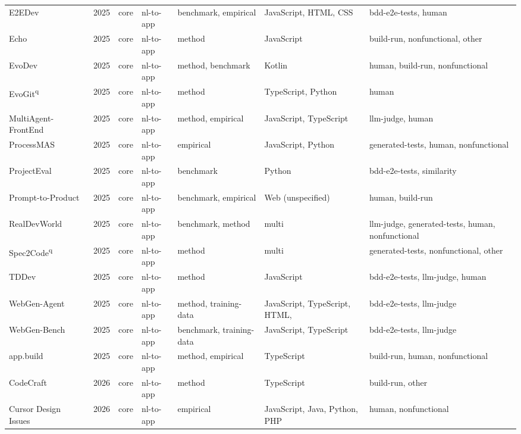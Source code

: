 {\begin{longtable}{@{}p{2.8cm}lllp{1.9cm}p{1.5cm}p{2.9cm}@{}}
E2EDev~\cite{E2EDev2025} & 2025 & core & nl-to-app & benchmark, empirical & JavaScript, HTML, CSS & bdd-e2e-tests, human \\
Echo~\cite{Echo2025} & 2025 & core & nl-to-app & method & JavaScript & build-run, nonfunctional, other \\
EvoDev~\cite{EvoDev2025} & 2025 & core & nl-to-app & method, benchmark & Kotlin & human, build-run, nonfunctional \\
EvoGit\textsuperscript{q}~\cite{EvoGit2025} & 2025 & core & nl-to-app & method & TypeScript, Python & human \\
MultiAgent-FrontEnd~\cite{MultiAgentFrontEnd2025} & 2025 & core & nl-to-app & method, empirical & JavaScript, TypeScript & llm-judge, human \\
ProcessMAS~\cite{ProcessMAS2025} & 2025 & core & nl-to-app & empirical & JavaScript, Python & generated-tests, human, nonfunctional \\
ProjectEval~\cite{ProjectEval2025} & 2025 & core & nl-to-app & benchmark & Python & bdd-e2e-tests, similarity \\
Prompt-to-Product~\cite{PrompttoProduct2025} & 2025 & core & nl-to-app & benchmark, empirical & Web (unspecified) & human, build-run \\
RealDevWorld~\cite{RealDevWorld2025} & 2025 & core & nl-to-app & benchmark, method & multi & llm-judge, generated-tests, human, nonfunctional \\
Spec2Code\textsuperscript{q}~\cite{Spec2Code2025} & 2025 & core & nl-to-app & method & multi & generated-tests, nonfunctional, other \\
TDDev~\cite{TDDev2025} & 2025 & core & nl-to-app & method & JavaScript & bdd-e2e-tests, llm-judge, human \\
WebGen-Agent~\cite{WebGenAgent2025} & 2025 & core & nl-to-app & method, training-data & JavaScript, TypeScript, HTML,  & bdd-e2e-tests, llm-judge \\
WebGen-Bench~\cite{WebGenBench2025} & 2025 & core & nl-to-app & benchmark, training-data & JavaScript, TypeScript & bdd-e2e-tests, llm-judge \\
app.build~\cite{appbuild2025} & 2025 & core & nl-to-app & method, empirical & TypeScript & build-run, human, nonfunctional \\
CodeCraft~\cite{CodeCraft2026} & 2026 & core & nl-to-app & method & TypeScript & build-run, other \\
Cursor Design Issues~\cite{CursorDesignIssues2026} & 2026 & core & nl-to-app & empirical & JavaScript, Java, Python, PHP & human, nonfunctional \\

\end{longtable}}
